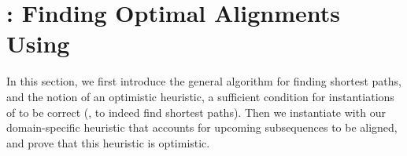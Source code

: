 \section{\astarix: Finding Optimal Alignments Using \A} \label{sec:astarix-algo}
In this section, we first introduce the general \A algorithm for finding
shortest paths, and the notion of an optimistic heuristic, a sufficient
condition for instantiations of \A to be correct (\ie, to indeed find shortest
paths). Then we instantiate \A with our domain-specific heuristic that accounts
for upcoming subsequences to be aligned, and prove that this heuristic is
optimistic.


